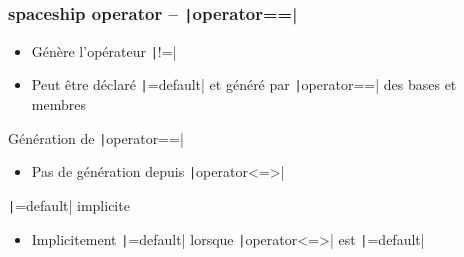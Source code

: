 \documentclass[C++.tex]{subfiles}
\begin{document}
\begin{frame}[fragile]
	\frametitle{spaceship operator -- \texttt|operator==|}
	\begin{itemize}
		\item Génère l'opérateur \texttt|!=|
		\item Peut être déclaré \texttt|=default| et généré par \texttt|operator==| des bases et membres
	\end{itemize}

	\begin{alertblock}{Génération de \texttt|operator==|}
		\begin{itemize}
			\item Pas de génération depuis \texttt|operator<=>|

		\end{itemize}
	\end{alertblock}

	\begin{exampleblock}{\texttt|=default| implicite}
		\begin{itemize}
			\item Implicitement \texttt|=default| lorsque \texttt|operator<=>| est \texttt|=default|
		\end{itemize}
	\end{exampleblock}


\end{frame}
\end{document}
